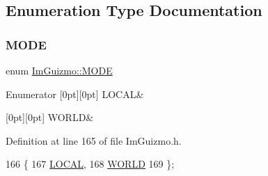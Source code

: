 \subsection{Enumeration Type Documentation}
\mbox{\label{namespace_im_guizmo_a555eafa3970d08a1afb7b47bce89d05a}} 
\subsubsection{\texorpdfstring{M\+O\+DE}{MODE}}
{\footnotesize\ttfamily enum \mbox{\hyperlink{namespace_im_guizmo_a555eafa3970d08a1afb7b47bce89d05a}{Im\+Guizmo\+::\+M\+O\+DE}}}

\begin{DoxyEnumFields}{Enumerator}
[0pt][0pt]{}\mbox{\label{namespace_im_guizmo_a555eafa3970d08a1afb7b47bce89d05aaf0baed0c04cc42cc097e385019888fe7}} 
L\+O\+C\+AL&\\
\hline

[0pt][0pt]{}\mbox{\label{namespace_im_guizmo_a555eafa3970d08a1afb7b47bce89d05aa0db6bcb67dbf7b93b609e4d142320421}} 
W\+O\+R\+LD&\\
\hline

\end{DoxyEnumFields}


Definition at line 165 of file Im\+Guizmo.\+h.


\begin{DoxyCode}
166   \{
167     \mbox{\hyperlink{namespace_im_guizmo_a555eafa3970d08a1afb7b47bce89d05aaf0baed0c04cc42cc097e385019888fe7}{LOCAL}},
168     \mbox{\hyperlink{namespace_im_guizmo_a555eafa3970d08a1afb7b47bce89d05aa0db6bcb67dbf7b93b609e4d142320421}{WORLD}}
169   \};
\end{DoxyCode}
\mbox{\label{namespace_im_guizmo_a3559e88fd6409ce121ee4d9847867cd1}} 
